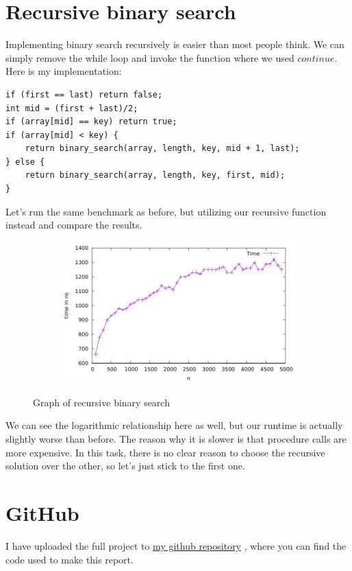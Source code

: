 \documentclass[a4paper,11pt]{article}
\newcommand{\underlinehref}[2]{%
    \href{#1}{\ul{#2}}%
}
\begin{document}
    \section*{Recursive binary search}

    Implementing binary search recursively is easier than most people think.
    We can simply remove the while loop and invoke the function where we used $continue$.
    Here is my implementation:

    \begin{verbatim}
if (first == last) return false;
int mid = (first + last)/2;
if (array[mid] == key) return true;
if (array[mid] < key) {
    return binary_search(array, length, key, mid + 1, last);
} else {
    return binary_search(array, length, key, first, mid);
}
    \end{verbatim}

    Let's run the same benchmark as before, but utilizing our recursive function instead and compare the results.

    \begin{figure}[h]
        \centering
        \begin{subfigure}[b]{.5\textwidth}
            \centering
            \includegraphics[width=\textwidth]{./binary_recursive/data} %
        \end{subfigure}
        \caption{Graph of recursive binary search}
        \label{fig:graph_4}
    \end{figure}

    We can see the logarithmic relationship here as well, but our runtime is actually slightly worse than before.
    The reason why it is slower is that procedure calls are more expensive.
    In this task, there is no clear reason to choose the recursive solution over the other, so let's just stick to the first one.

    \section*{GitHub}
    I have uploaded the full project to \underlinehref{https://github.com/peterherczku/ID1021/tree/main/assignment-3}{my github repository}, where you can find the code used to make this report.
\end{document}
